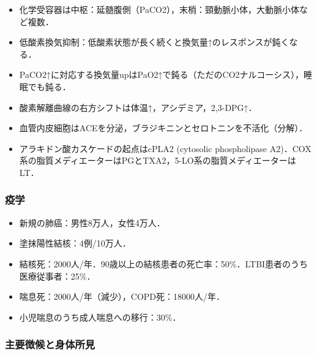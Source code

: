 \begin{itemize}
\item 化学受容器は中枢：延髄腹側（PaCO2），末梢：頸動脈小体，大動脈小体など複数．
\item 低酸素換気抑制：低酸素状態が長く続くと換気量↑のレスポンスが鈍くなる．
\item PaCO2↑に対応する換気量upはPaO2↑で鈍る（ただのCO2ナルコーシス），睡眠でも鈍る．
\item 酸素解離曲線の右方シフトは体温↑，アシデミア，2,3-DPG↑．
\item 血管内皮細胞はACEを分泌，ブラジキニンとセロトニンを不活化（分解）．
\item アラキドン酸カスケードの起点はcPLA2 (cytosolic phospholipase A2)．COX系の脂質メディエーターはPGとTXA2，5-LO系の脂質メディエーターはLT．
\end{itemize}


\subsubsection{疫学}

\begin{itemize}
\item 新規の肺癌：男性8万人，女性4万人．
\item 塗抹陽性結核：4例/10万人．
\item 結核死：2000人/年．90歳以上の結核患者の死亡率：50\%．LTBI患者のうち医療従事者：25\%．
\item 喘息死：2000人/年（減少），COPD死：18000人/年．
\item 小児喘息のうち成人喘息への移行：30\%．
\end{itemize}


\subsubsection{主要徴候と身体所見}

